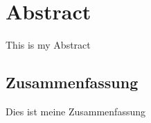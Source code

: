 \begingroup
\let\clearpage\relax
\let\cleardoublepage\relax
\let\cleardoublepage\relax
\chapter*{Abstract}

This is my Abstract

\newpage
\begin{otherlanguage}{ngerman}
\chapter*{Zusammenfassung}
Dies ist meine Zusammenfassung


\end{otherlanguage}

\endgroup

\vfill
